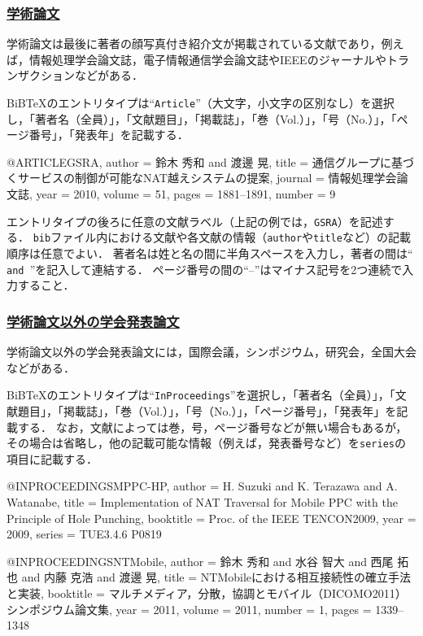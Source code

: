\documentclass[a4j,11pt]{ujreport}
\begin{document}
\subsubsection{\underline{学術論文}}
学術論文は最後に著者の顔写真付き紹介文が掲載されている文献であり，例えば，情報処理学会論文誌，電子情報通信学会論文誌やIEEEのジャーナルやトランザクションなどがある．

BiB{\TeX}のエントリタイプは``\texttt{Article}''（大文字，小文字の区別なし）を選択し，「著者名（全員）」，「文献題目」，「掲載誌」，「巻（Vol.）」，「号（No.）」，「ページ番号」，「発表年」を記載する．

\begin{code}
@ARTICLE{GSRA,
  author = {鈴木 秀和 and 渡邊 晃},
  title = {通信グループに基づくサービスの制御が可能なNAT越えシステムの提案},
  journal = {情報処理学会論文誌},
  year = {2010},
  volume = {51},
  pages = {1881--1891},
  number = {9}
}
\end{code}

エントリタイプの後ろに任意の文献ラベル（上記の例では，\texttt{GSRA}）を記述する．
\texttt{bib}ファイル内における文献や各文献の情報（\texttt{author}や\texttt{title}など）の記載順序は任意でよい．
著者名は姓と名の間に半角スペースを入力し，著者の間は``\texttt{ and }''を記入して連結する．
ページ番号の間の``--''はマイナス記号を2つ連続で入力すること．

\subsubsection{\underline{学術論文以外の学会発表論文}}
学術論文以外の学会発表論文には，国際会議，シンポジウム，研究会，全国大会などがある．

BiB{\TeX}のエントリタイプは``\texttt{InProceedings}''を選択し，「著者名（全員）」，「文献題目」，「掲載誌」，「巻（Vol.）」，「号（No.）」，「ページ番号」，「発表年」を記載する．
なお，文献によっては巻，号，ページ番号などが無い場合もあるが，その場合は省略し，他の記載可能な情報（例えば，発表番号など）を\texttt{series}の項目に記載する．

\begin{code}
@INPROCEEDINGS{MPPC-HP,
  author = {H. Suzuki and K. Terazawa and A. Watanabe},
  title = {Implementation of NAT Traversal for Mobile PPC with the Principle of
           Hole Punching},
  booktitle = {Proc. of the IEEE TENCON2009},
  year = {2009},
  series = {TUE3.4.6 P0819}
}
\end{code}

\begin{code}
@INPROCEEDINGS{NTMobile,
  author = {鈴木 秀和 and 水谷 智大 and 西尾 拓也 and 内藤 克浩 and 渡邊 晃},
  title = {NTMobileにおける相互接続性の確立手法と実装},
  booktitle = {マルチメディア，分散，協調とモバイル（DICOMO2011）シンポジウム論文集},
  year = {2011},
  volume = {2011},
  number = {1},
  pages = {1339--1348}
}
\end{code}
\end{document}
